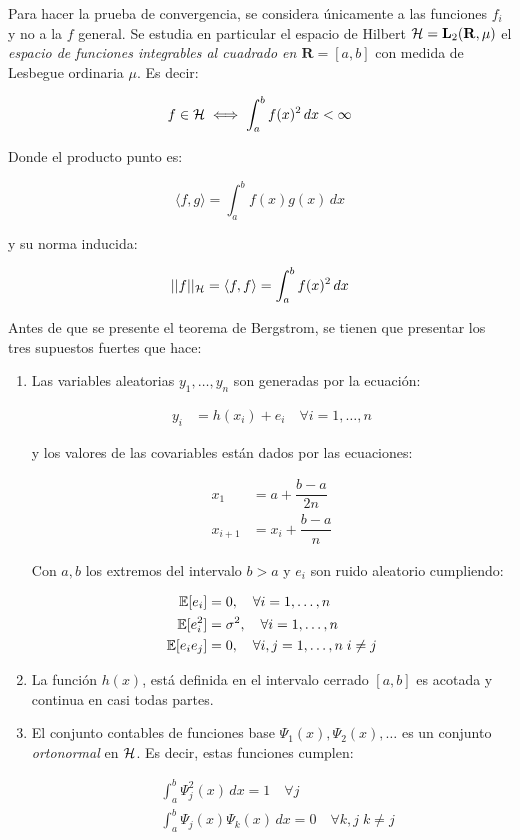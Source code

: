 \documentclass[../Main/Main.tex]{subfiles}
\begin{document}
Para hacer la prueba de convergencia, se considera únicamente a las funciones $f_i$ y no a la $f$ general. Se estudia en particular el espacio de Hilbert $\mathcal{H} = \mathbf{L}_2(\mathbf{R},\mu)$ el \textit{espacio de funciones integrables al cuadrado en $\mathbf{R} = [a,b]$} con medida de Lesbegue ordinaria $\mu$. Es decir: 

$$f \in \mathcal{H} \iff \int_a^b f(x)^2 \,dx < \infty$$

Donde el producto punto es:

$$\langle f,g\rangle = \int_a^b f(x)g(x) \,dx$$

y su norma inducida:

$$||f||_{\mathcal{H}} = \langle f,f\rangle = \int_a^b f(x)^2 \,dx $$

Antes de que se presente el teorema de Bergstrom, se tienen que presentar los tres supuestos fuertes que hace:

\begin{enumerate}
	\item Las variables aleatorias $y_1,\ldots,y_n$ son generadas por la ecuación:
	
	\begin{align*}
		y_i &= h(x_i) + e_i \quad \forall i =1,\ldots,n
	\end{align*}
	
	y los valores de las covariables están dados por las ecuaciones:
	
	\begin{align}
		x_1 &= a + \dfrac{b-a}{2n} \\ \label{ec:ProcesoGenX}
		x_{i+1} &= x_i + \dfrac{b-a}{n} \nonumber
	\end{align}
	
	Con $a,b$ los extremos del intervalo $b>a$ y $e_i$ son ruido aleatorio cumpliendo:
	
	\begin{align}
		\mathbb{E}[e_i] &= 0, \quad \forall i = 1,\ldots,n \\ 
		\mathbb{E}[e_i^2] &= \sigma^2, \quad \forall i = 1,\ldots,n 	\nonumber \\ 
		\mathbb{E}[e_ie_j] &= 0, \quad \forall i,j = 1,\ldots,n \; i\neq j	\nonumber		
	\end{align}
	
	\item La función $h(x)$, está definida en el intervalo cerrado $[a,b]$ es acotada y continua en casi todas partes.
	
	\item El conjunto contables de funciones base $\Psi_1(x), \Psi_2(x),\ldots$ es un conjunto \textit{ortonormal} en $\mathcal{H}$. Es decir, estas funciones cumplen:
	
	\begin{align}
		&\int_a^b \Psi_j^2(x)\,dx = 1 \quad \forall j \\[2pt]
		&\int_a^b \Psi_j(x)\Psi_k(x) \,dx = 0 \quad \forall k,j\; k \neq j \nonumber
	\end{align}
\end{enumerate}
\end{document}
